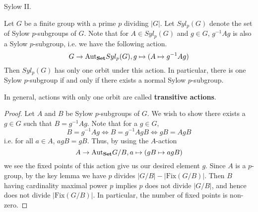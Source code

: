 \documentclass[../../book.tex]{subfiles}
\begin{document}
\begin{thm} Sylow II.
    
    Let $G$ be a finite group with a prime $p$ dividing $|G|$.
    Let $Syl_p(G)$ denote the set of Sylow $p$-subgroups of $G$. 
    Note that for $A \in Syl_p(G)$ and $g \in G$, 
    $g^{-1} A g$ is also a Sylow $p$-subgroup,
    i.e. we have the following action. \[
        G \to \mathrm{Aut}_{\mathbf{Set}}Syl_p(G), g \mapsto (A \mapsto g^{-1} A g)
    \]
    Then $Syl_p(G)$ has only one orbit under this action.
    In particular, there is one Sylow $p$-subgroup if and only if 
    there exists a normal Sylow $p$-subgroup. 
    
    In general, actions with only one orbit are called
    \textbf{transitive actions}. 
\end{thm}
\begin{proof}
    
    Let $A$ and $B$ be Sylow $p$-subgroups of $G$. 
    We wish to show there exists a $g \in G$ such that $B = g^{-1} A g$. 
    Note that for a $g \in G$, 
    \[
        B = g^{-1} A g \iff B = g^{-1} A g B \iff g B = A g B
    \]
    i.e. for all $a \in A$, $a g B = g B$. 
    Thus, by using the $A$-action \[
        A \to \mathrm{Aut}_{\mathbf{Set}}G / B, a \mapsto (gB \mapsto a gB)
    \]
    we see the fixed points of this action give us our desired element $g$. 
    Since $A$ is a $p$-group, by the key lemma we have
    $p$ divides $|G / B| - |\mathrm{Fix}(G / B)|$.
    Then $B$ having cardinality maximal power $p$ implies 
    $p$ does not divide $|G / B|$, 
    and hence does not divide $|\mathrm{Fix}(G / B)|$.
    In particular, the number of fixed points is non-zero. 
    
\end{proof}
\end{document}
